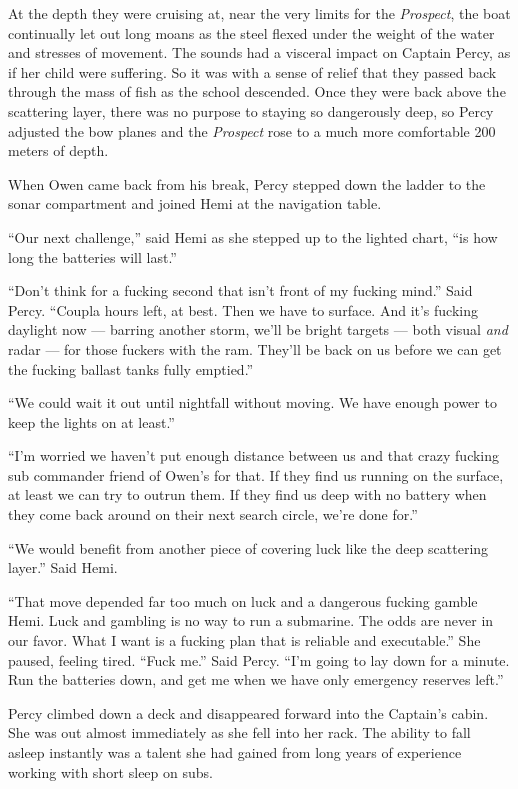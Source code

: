 \documentclass[
]{scrbook}
\begin{document}
At the depth they were cruising at, near the very limits for the
\emph{Prospect}, the boat continually let out long moans as the steel
flexed under the weight of the water and stresses of movement. The
sounds had a visceral impact on Captain Percy, as if her child were
suffering. So it was with a sense of relief that they passed back
through the mass of fish as the school descended. Once they were back
above the scattering layer, there was no purpose to staying so
dangerously deep, so Percy adjusted the bow planes and the
\emph{Prospect} rose to a much more comfortable 200 meters of depth.

When Owen came back from his break, Percy stepped down the ladder to the
sonar compartment and joined Hemi at the navigation table.

``Our next challenge,'' said Hemi as she stepped up to the lighted
chart, ``is how long the batteries will last.''

``Don't think for a fucking second that isn't front of my fucking
mind.'' Said Percy. ``Coupla hours left, at best. Then we have to
surface. And it's fucking daylight now --- barring another storm, we'll
be bright targets --- both visual \emph{and} radar --- for those fuckers
with the ram. They'll be back on us before we can get the fucking
ballast tanks fully emptied.''

``We could wait it out until nightfall without moving. We have enough
power to keep the lights on at least.''

``I'm worried we haven't put enough distance between us and that crazy
fucking sub commander friend of Owen's for that. If they find us running
on the surface, at least we can try to outrun them. If they find us deep
with no battery when they come back around on their next search circle,
we're done for.''

``We would benefit from another piece of covering luck like the deep
scattering layer.'' Said Hemi.

``That move depended far too much on luck and a dangerous fucking gamble
Hemi. Luck and gambling is no way to run a submarine. The odds are never
in our favor. What I want is a fucking plan that is reliable and
executable.'' She paused, feeling tired. ``Fuck me.'' Said Percy. ``I'm
going to lay down for a minute. Run the batteries down, and get me when
we have only emergency reserves left.''

Percy climbed down a deck and disappeared forward into the Captain's
cabin. She was out almost immediately as she fell into her rack. The
ability to fall asleep instantly was a talent she had gained from long
years of experience working with short sleep on subs.
\end{document}
